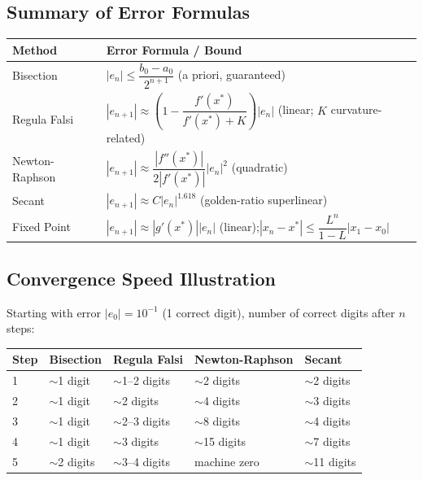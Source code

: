 \documentclass[12pt]{article}
\newcommand{\hcell}[1]{\textbf{\color{white}#1}}
\begin{document}
\bigskip

\subsection*{Summary of Error Formulas}

\begin{center}{\small
\begin{tabular}{p{3.2cm} p{10cm}}
\toprule
\rowcolor{primary}
\hcell{Method} & \hcell{Error Formula / Bound} \\
\midrule
\rowcolor{amberbg}
Bisection & $|e_n|\leq\dfrac{b_0-a_0}{2^{n+1}}$ \quad(a priori, guaranteed) \\[6pt]
Regula Falsi & $|e_{n+1}|\approx\left(1-\dfrac{f'(x^*)}{f'(x^*)+K}\right)|e_n|$ \quad(linear; $K$ curvature-related) \\[6pt]
\rowcolor{amberbg}
Newton-Raphson & $|e_{n+1}|\approx\dfrac{|f''(x^*)|}{2|f'(x^*)|}|e_n|^2$ \quad(quadratic) \\[6pt]
Secant & $|e_{n+1}|\approx C|e_n|^{1.618}$ \quad(golden-ratio superlinear) \\[6pt]
\rowcolor{amberbg}
Fixed Point & $|e_{n+1}|\approx|g'(x^*)||e_n|$ \quad(linear);\quad $|x_n-x^*|\leq\dfrac{L^n}{1-L}|x_1-x_0|$ \\
\bottomrule
\end{tabular}
}\end{center}

\bigskip

\subsection*{Convergence Speed Illustration}

Starting with error $|e_0| = 10^{-1}$ (1 correct digit), number of correct digits after $n$ steps:

\begin{center}
{\small
\begin{tabular}{C{1cm} C{2.5cm} C{2.5cm} C{2.5cm} C{2.5cm}}
\toprule
{}
\hcell{Step} & \hcell{Bisection} & \hcell{Regula Falsi} & \hcell{Newton-Raphson} & \hcell{Secant} \\
\midrule
{}
1 & $\sim$1 digit  & $\sim$1--2 digits & $\sim$2 digits  & $\sim$2 digits \\
2 & $\sim$1 digit  & $\sim$2 digits    & $\sim$4 digits  & $\sim$3 digits \\
3 & $\sim$1 digit  & $\sim$2--3 digits & $\sim$8 digits  & $\sim$4 digits \\
4 & $\sim$1 digit  & $\sim$3 digits    & $\sim$15 digits & $\sim$7 digits \\
5 & $\sim$2 digits & $\sim$3--4 digits & machine zero    & $\sim$11 digits \\
\bottomrule
\end{tabular}
}
\end{center}
\end{document}
